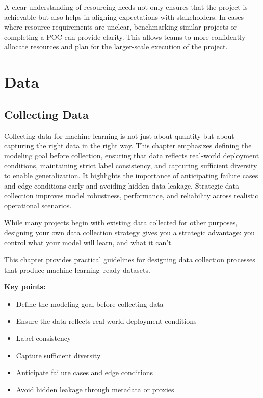\documentclass[12pt,openany]{book}
\begin{document}
A clear understanding of resourcing needs not only ensures that the project is achievable but also helps in aligning expectations with stakeholders. In cases where resource requirements are unclear, benchmarking similar projects or completing a POC can provide clarity. This allows teams to more confidently allocate resources and plan for the larger-scale execution of the project. \newline





\part{Data}




\chapter{Collecting Data}

\begin{summarybox}
Collecting data for machine learning is not just about quantity but about capturing the right data in the right way. This chapter emphasizes defining the modeling goal before collection, ensuring that data reflects real-world deployment conditions, maintaining strict label consistency, and capturing sufficient diversity to enable generalization. It highlights the importance of anticipating failure cases and edge conditions early and avoiding hidden data leakage. Strategic data collection improves model robustness, performance, and reliability across realistic operational scenarios.
\end{summarybox}

While many projects begin with existing data collected for other purposes, designing your own data collection strategy gives you a strategic advantage: you control what your model will learn, and what it can’t.
\newline

This chapter provides practical guidelines for designing data collection processes that produce machine learning–ready datasets. \newline

\textbf{Key points:}
\begin{itemize}
    \item Define the modeling goal before collecting data
    \item Ensure the data reflects real-world deployment conditions
    \item Label consistency
    \item Capture sufficient diversity 
    \item Anticipate failure cases and edge conditions
    \item Avoid hidden leakage through metadata or proxies
\end{itemize}
\end{document}
